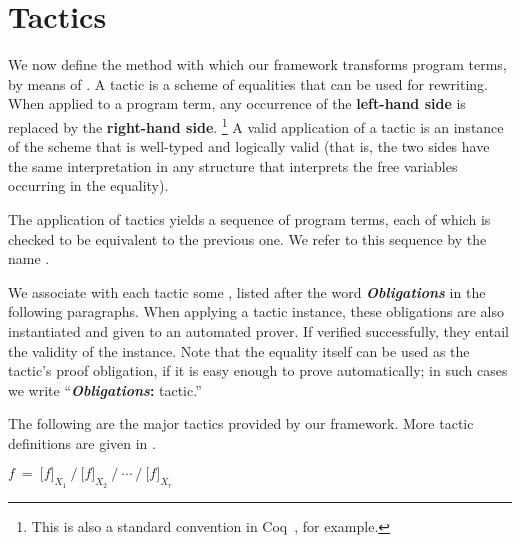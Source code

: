 \section{Tactics}
\label{tactics}

We now define the method with which our framework transforms program terms, by means of .
A tactic is a scheme of equalities that can be used for rewriting.
When applied to a program term, any occurrence of the {\bf left-hand side} is replaced by the {\bf right-hand side}.%
\footnote{This is also a standard convention in Coq~\cite{COQ}, for example.}
A valid application of a tactic is an instance of the scheme that is well-typed and logically valid
(that is, the two sides have the same interpretation in any structure that interprets the free
variables occurring in the equality).

The application of tactics yields a sequence of program terms, each of which is checked to
be equivalent to the previous one. We refer to this sequence by the name .

We associate with each tactic some , listed after the word \textbf{\textit{Obligations}}
in the following paragraphs.
When applying a tactic instance, these obligations are also instantiated and given to an automated prover. 
If verified successfully, they entail the validity of the instance. 
Note that the equality itself can be used as the tactic's proof obligation, if it is easy enough to prove automatically; 
in such cases we write ``\textbf{\textit{Obligations}:} tactic.''

The following are the major tactics provided by our framework. 
More tactic definitions are given in .

\newcommand\Obligations{\medskip\noindent\textbf{\textit{Obligations}:} }
\newcommand\reduce{\operatorname{reduce}}
\newcommand\listConcat{{\scriptstyle \,++\,}}

\theoremstyle{definition}
\newtheorem{tactic}{Tactic}

\newcommand\tacticdef[1]{\subsection*{\sf\larger #1}}
\newcommand\tacticdefcompact[1]{\medskip\noindent{\sf\larger #1}\medskip\hfill}

\tacticdefcompact{Slice} \label{tactics:Slice}
$f ~=~ \big[f\big]_{X_1} ~\Big/~ \big[f\big]_{X_2} ~\Big/ ~\cdots~ \Big/~ \big[f\big]_{X_r}$\hspace{2mm}

